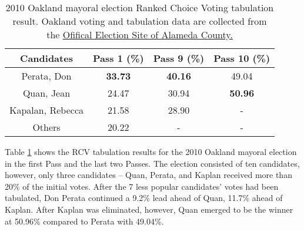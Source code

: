 \begin{table}[h]
\centering
\begin{tabular}{|c|c|c|c|}
\hline
Candidates & Pass 1 (\%) & Pass 9 (\%) & Pass 10 (\%) \\ \hline
Perata, Don & \textbf{33.73} & \textbf{40.16} & 49.04 \\ \hline
Quan, Jean & 24.47 & 30.94 & \textbf{50.96} \\ \hline
Kapalan, Rebecca & 21.58 & 28.90 & - \\ \hline
Others & 20.22 & - & - \\ \hline
\end{tabular}
\caption{2010 Oakland mayoral election Ranked Choice Voting tabulation result. Oakland voting and tabulation data are collected from the \href{https://acvote.alamedacountyca.gov/acvote-assets/pdf/elections/2010/11022010/results/rcv/oakland/mayor/november-2-2010-pass-report-oakland-mayor.pdf}{Ofifical Election Site of Alameda County.}}
\label{tab:8}
\end{table}

Table \ref{tab:8} shows the RCV tabulation results for the 2010 Oakland mayoral election in the first Pass and the last two Passes. The election consisted of ten candidates, however, only three candidates – Quan, Perata, and Kaplan received more than 20\% of the initial votes. After the 7 less popular candidates’ votes had been tabulated, Don Perata continued a 9.2\% lead ahead of Quan, 11.7\% ahead of Kaplan. After Kaplan was eliminated, however, Quan emerged to be the winner at 50.96\% compared to Perata with 49.04\%. 

\begin{figure}[ht]
  \centering
  \label{fig:1}
\end{figure}

